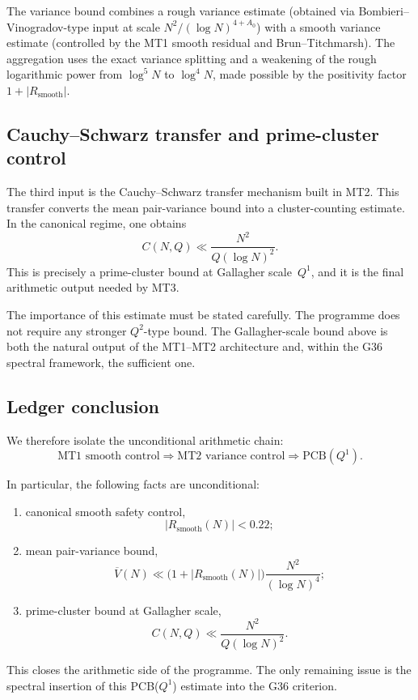 \documentclass[11pt,a4paper]{article}
\begin{document}
The variance bound combines a rough variance estimate (obtained via Bombieri--Vinogradov-type input at scale $N^2/(\log N)^{4+A_0}$) with a smooth variance estimate (controlled by the MT1 smooth residual and Brun--Titchmarsh). The aggregation uses the exact variance splitting and a weakening of the rough logarithmic power from $\log^5 N$ to $\log^4 N$, made possible by the positivity factor $1 + |R_{\mathrm{smooth}}|$.

\subsection{Cauchy--Schwarz transfer and prime-cluster control}

The third input is the Cauchy--Schwarz transfer mechanism built in MT2. This transfer converts the mean pair-variance bound into a cluster-counting estimate. In the canonical regime, one obtains
\[
C(N,Q) \ll \frac{N^2}{Q(\log N)^2}.
\]
This is precisely a prime-cluster bound at Gallagher scale~$Q^1$, and it is the final arithmetic output needed by MT3.

The importance of this estimate must be stated carefully. The programme does not require any stronger $Q^2$-type bound. The Gallagher-scale bound above is both the natural output of the MT1--MT2 architecture and, within the G36 spectral framework, the sufficient one.

\subsection{Ledger conclusion}

We therefore isolate the unconditional arithmetic chain:
\[
\text{MT1 smooth control} \Longrightarrow \text{MT2 variance control} \Longrightarrow \text{PCB}(Q^1).
\]

In particular, the following facts are unconditional:

\begin{enumerate}
    \item canonical smooth safety control,
    \[
    |R_{\mathrm{smooth}}(N)| < 0.22;
    \]
    \item mean pair-variance bound,
    \[
    \overline{V}(N) \ll \bigl(1 + |R_{\mathrm{smooth}}(N)|\bigr) \frac{N^2}{(\log N)^4};
    \]
    \item prime-cluster bound at Gallagher scale,
    \[
    C(N,Q) \ll \frac{N^2}{Q(\log N)^2}.
    \]
\end{enumerate}

This closes the arithmetic side of the programme. The only remaining issue is the spectral insertion of this PCB($Q^1$) estimate into the G36 criterion.
\end{document}
